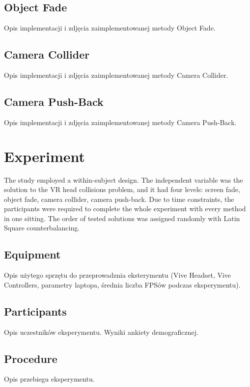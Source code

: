 \subsection{Object Fade}

Opis implementacji i zdjęcia zaimplementowanej metody Object Fade.

\subsection{Camera Collider}

Opis implementacji i zdjęcia zaimplementowanej metody Camera Collider.

\subsection{Camera Push-Back}

Opis implementacji i zdjęcia zaimplementowanej metody Camera Push-Back.

\section{Experiment}

The study employed a within-subject design. The independent variable was the solution to the VR head collisions problem, and it had four levels: screen fade, object fade, camera collider, camera push-back. Due to time constraints, the participants were required to complete the whole experiment with every method in one sitting. The order of tested solutions was assigned randomly with Latin Square counterbalancing. 

\subsection{Equipment}

Opis użytego sprzętu do przeprowadznia eksterymentu (Vive Headset, Vive Controllers, parametry laptopa, średnia liczba FPSów podczas eksperymentu).

\subsection{Participants}

Opis uczestników eksperymentu. Wyniki ankiety demograficznej.

\subsection{Procedure}

Opis przebiegu eksperymentu.